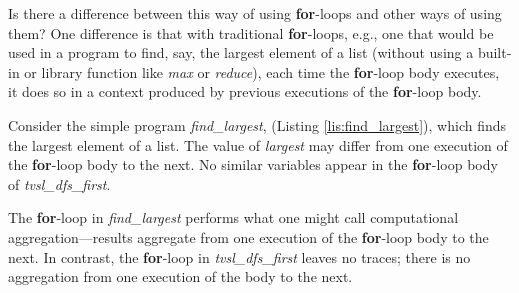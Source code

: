 Is there a difference between this way of using \textbf{for}-loops and other ways of using them? One difference is that with traditional \textbf{for}-loops, e.g., one that would be used in a program to find, say, the largest element of a list (without using a built-in or library function like \textit{max} or \textit{reduce}), each time the \textbf{for}-loop body executes, it does so in a context produced by previous executions of the \textbf{for}-loop body. 





Consider the simple program \textit{find\_largest}, (Listing \ref{lis:find_largest}), which finds the largest element of a list. The value of \textit{largest} may differ from one execution of the \textbf{for}-loop body to the next. No similar variables appear in the \textbf{for}-loop body of \textit{tvsl\_dfs\_first}. %

The \textbf{for}-loop in \textit{find\_largest} performs what one might call computational aggregation---results aggregate from one execution of the \textbf{for}-loop body to the next. In contrast, the \textbf{for}-loop in \textit{tvsl\_dfs\_first} leaves no traces; there is no aggregation from one execution of the body to the next.

